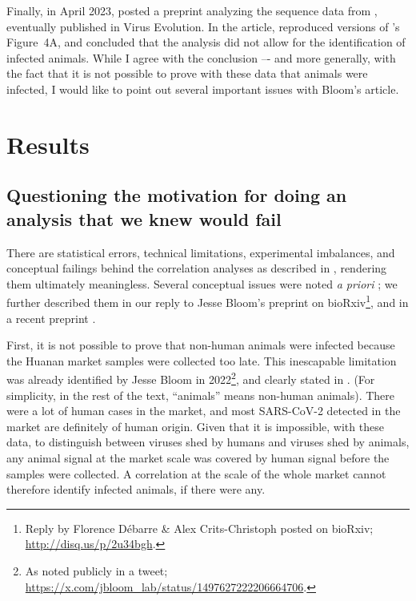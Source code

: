 \documentclass[11pt]{article}
\def \sct {\mbox{SARS-CoV-2}}
\begin{document}
Finally, in April 2023, \citet{Bloom2023bioRxiv} posted a preprint analyzing the sequence data from \citet{Liu2023Nature}, eventually published in Virus Evolution. In the article, \citet{Bloom2023VE} reproduced versions of \citet{Liu2022RS}'s Figure~4A, and concluded that the analysis did not allow for the identification of infected animals. While I agree with the conclusion –- and more generally, with the fact that it is not possible to prove with these data that animals were infected, I would like to point out several important issues with Bloom's article. 

\section{Results}

\subsection{Questioning the motivation for doing an analysis that we knew would fail}

There are statistical errors, technical limitations, experimental imbalances, and conceptual failings behind the correlation analyses as described in \citet{Bloom2023VE}, rendering them ultimately meaningless. Several conceptual issues were noted \textit{a priori} \citep{ACC2023Zenodo}; we further described them in our reply to Jesse Bloom's preprint on bioRxiv\footnote{\label{foot:reply}Reply by Florence D\'ebarre \& Alex Crits-Christoph posted on bioRxiv; \url{http://disq.us/p/2u34bgh}.}, and in a recent preprint \citep{ACC2023bioRxiv}. 

First, it is not possible to prove that non-human animals were infected because the Huanan market samples were collected too late. This inescapable limitation was already identified by Jesse Bloom in 2022\footnote{As noted publicly in a tweet; \url{https://x.com/jbloom_lab/status/1497627222206664706}.}, and clearly stated in \citet{Bloom2023VE}. (For simplicity, in the rest of the text, ``animals'' means non-human animals). There were a lot of human cases in the market, and most \sct{} detected in the market are definitely of human origin. Given that it is impossible, with these data, to distinguish between viruses shed by humans and viruses shed by animals, any animal signal at the market scale was covered by human signal before the samples were collected. A correlation at the scale of the whole market cannot therefore identify infected animals, if there were any.
\end{document}
